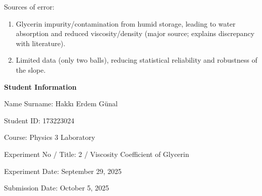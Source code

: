 \documentclass[12pt, a4paper]{article}
\begin{document}
Sources of error:
\begin{enumerate}
	\item Glycerin impurity/contamination from humid storage, leading to water absorption and reduced viscosity/density (major source; explains discrepancy with literature).
	\item Limited data (only two balls), reducing statistical reliability and robustness of the slope.
\end{enumerate}

\newpage

\textbf{Student Information}

Name Surname: Hakkı Erdem Günal

Student ID: 173223024

Course: Physics 3 Laboratory

Experiment No / Title: 2 / Viscosity Coefficient of Glycerin

Experiment Date: September 29, 2025

Submission Date: October 5, 2025
\end{document}
